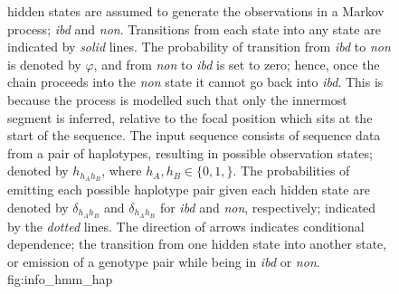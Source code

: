 \begin{figure}[!htb]
%
{ hidden states are assumed to generate the observations in a Markov process; \emph{ibd} and \emph{non}.
Transitions from each state into any state are indicated by \emph{solid} lines.
The probability of transition from \emph{ibd} to \emph{non} is denoted by $\varphi$, and from \emph{non} to \emph{ibd} is set to zero; hence, once the chain proceeds into the \emph{non} state it cannot go back into \emph{ibd}.
This is because the process is modelled such that only the innermost segment is inferred, relative to the focal position which sits at the start of the sequence.
The input sequence consists of sequence data from a pair of haplotypes, resulting in  possible observation states; denoted by $h_{h_A h_B}$, where ${h_A,h_B \in \lbrace 0,1,\rbrace}$.
The probabilities of emitting each possible haplotype pair given each hidden state are denoted by $\delta_{h_A h_B}$ and $\delta_{h_A h_B}$ for \emph{ibd} and \emph{non}, respectively; indicated by the \emph{dotted} lines.
The direction of arrows indicates conditional dependence; \ie the transition from one hidden state into another state, or emission of a genotype pair while being in \emph{ibd} or \emph{non}.}%
{fig:info_hmm_hap}
\end{figure}
